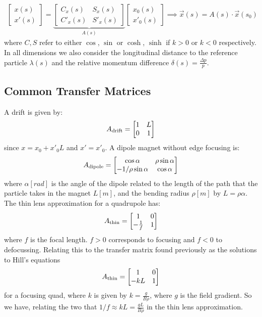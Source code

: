 \documentclass{article}
\numberwithin{equation}{section}
\begin{document}
\begin{align}
\begin{bmatrix} x(s) \\ x'(s) \end{bmatrix} =
\underbrace{\begin{bmatrix} C_x(s) & S_x(s) \\ C'_x(s) & S'_x(s) \end{bmatrix}}_{A(s)}
\begin{bmatrix} x_0(s) \\ x'_0(s) \end{bmatrix} \implies \vec{x}(s) = A(s) \cdot \vec{x}(s_0)
\end{align}
where $C,S$ refer to either $\cos$, $\sin$ or $\cosh$, $\sinh$ if $k>0$ or $k<0$ respectively. In all dimensions we also consider the longitudinal distance to the reference particle $\lambda(s)$ and the relative momentum difference $\delta(s) = \frac{\Delta p}{p}$. 

\subsection{Common Transfer Matrices}

A drift is given by: 
\begin{align}
A_{\rm drift} = \begin{bmatrix} 1 & L \\ 0 & 1 \end{bmatrix}
\end{align}
since $x=x_0+x'_0L$ and $x' = x'_0$. A dipole magnet without edge focusing is:
\begin{align}
A_{\rm dipole} = \begin{bmatrix} \cos \alpha & \rho \sin \alpha \\ -1/\rho \sin \alpha & \cos \alpha \end{bmatrix}
\end{align}
where $\alpha [\si{rad}]$ is the angle of the dipole related to the length of the path that the particle takes in the magnet $L [\si{m}]$, and the bending radius $\rho [\si{m}]$ by $L = \rho \alpha$. The thin lens approximation for a quadrupole has:
\begin{align}
A_{\rm thin} = \begin{bmatrix} 1 & 0 \\ -\frac{1}{f} & 1 \end{bmatrix}
\end{align}
where $f$ is the focal length. $f>0$ corresponds to focusing and $f<0$ to defocussing. Relating this to the transfer matrix found previously as the solutions to Hill's equations 
\begin{align}
A_{\rm thin} = \begin{bmatrix} 1 & 0 \\ -kL & 1 \end{bmatrix}
\end{align}
for a focusing quad, where $k$ is given by $k=\frac{g}{B\rho}$, where $g$ is the field gradient. So we have, relating the two that $1/f \approx kL = \frac{gL}{B\rho}$ in the thin lens approximation.
\end{document}
